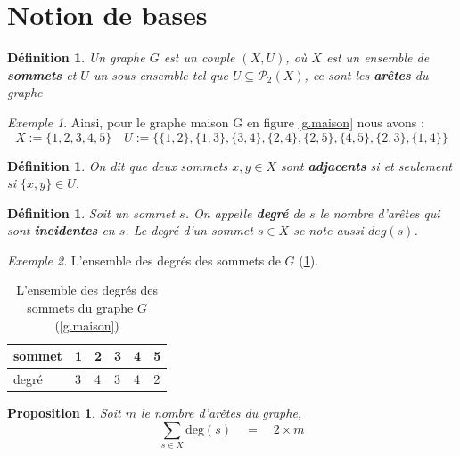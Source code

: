\documentclass[12pt,a4paper]{scrartcl}
\theoremstyle{plain}
\newtheorem{proposition}[theoreme]{Proposition}
\newtheorem{definition}[theoreme]{Définition}
\theoremstyle{remark}
\newtheorem*{exemple}{Exemple}
\begin{document}
\section{Notion de bases}

\begin{definition}
Un graphe $G$ est un couple $(X,U)$, où $X$ est un ensemble de \textbf{sommets} et
$U$ un sous-ensemble tel que $U \subseteq \mathcal{P}_2(X)$, ce sont les \textbf{arêtes} du graphe 
\end{definition}

\begin{exemple}
	Ainsi, pour le graphe maison G en figure \ref{g.maison} nous avons :
\[X:= \{ 1,2,3,4,5 \}\quad
U:= \{ \{1,2\},\{1,3\},\{3,4\},\{2,4\},\{2,5\},\{4,5\},\{2,3\},\{1,4\} \}\]	
\end{exemple}

\begin{definition}
	On dit que deux sommets $x,y \in X$ sont \textbf{adjacents} si et seulement si $\{x,y\} \in U$.
\end{definition}

\begin{definition}
	Soit un sommet $s$. On appelle \textbf{degré} de $s$ le nombre d'arêtes qui sont \textbf{incidentes} en $s$. Le degré d'un sommet $s \in X$ se note aussi $deg(s)$.
\end{definition}

\begin{exemple}
	L'ensemble des degrés des sommets de $G$ (\ref{t.deg}).
\end{exemple}

\begin{table}[tbp]
	\centering
	\begin{tabular}{|l|l|l|l|l|l|}
	\hline
	sommet & 1 & 2 & 3 & 4 & 5 \\
	\hline
	degré  & 3 & 4 & 3 & 4 & 2 \\
	\hline
	\end{tabular}
	\caption{L'ensemble des degrés des sommets du graphe $G$ (\ref{g.maison})}\label{t.deg}
	\end{table}

\begin{proposition}
	Soit $m$ le nombre d'arêtes du graphe,
	\begin{equation}
		\sum_{s \in X} \text{deg}(s)\quad=\quad 2\times m
	\end{equation}\label{eq.degsum}
		
\end{proposition}
\end{document}
